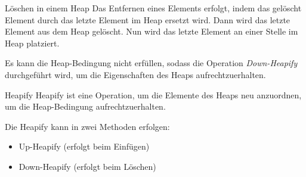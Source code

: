 \begin{algo}{Löschen in einem Heap}
    Das Entfernen eines Elements erfolgt, indem das gelöscht Element durch das letzte Element im Heap ersetzt wird. Dann wird das letzte Element aus dem Heap gelöscht. Nun wird das letzte Element an einer Stelle im Heap platziert.

    Es kann die Heap-Bedingung nicht erfüllen, sodass die Operation \emph{Down-Heapify} durchgeführt wird, um die Eigenschaften des Heaps aufrechtzuerhalten.
\end{algo}

\begin{defi}{Heapify}
    Heapify ist eine Operation, um die Elemente des Heaps neu anzuordnen, um die Heap-Bedingung aufrechtzuerhalten.

    Die Heapify kann in zwei Methoden erfolgen:
    \begin{itemize}
        \item Up-Heapify (erfolgt beim Einfügen)
        \item Down-Heapify (erfolgt beim Löschen)
    \end{itemize}
\end{defi}

